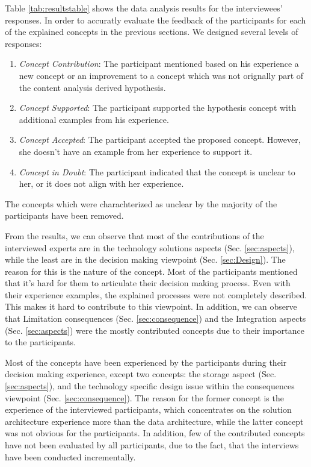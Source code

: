 \documentclass[conference]{IEEEtran}
\begin{document}
Table \ref{tab:resultstable} shows the data analysis results for the
interviewees' responses. In order to accuratly evaluate the feedback of the
participants for each of the explained concepts in the previous sections. We
designed several levels of responses:
\begin{enumerate}
\item \textit{Concept Contribution}: The participant mentioned based on
his experience a new concept or an improvement to a concept which was not
orignally part of the content analysis derived hypothesis.
\item \textit{Concept Supported}: The participant
supported the hypothesis concept with additional examples from his experience.
\item \textit{Concept Accepted}: The participant accepted
the proposed concept. However, she doesn't have an example from her experience
to support it.
\item \textit{Concept in Doubt}: The participant indicated that the concept is
unclear to her, or it does not align with her experience.
\end{enumerate}
The concepts which were charachterized as unclear by the majority of the
participants have been removed.

From the results, we can observe that most of the contributions of the
interviewed experts are in the technology solutions aspects (Sec.
\ref{sec:aspects}), while the least are in the decision making viewpoint (Sec.
\ref{sec:Design}). The reason for this is the nature of the concept. Most of
the participants mentioned that it's hard for them to articulate their decision
making process. Even with their experience examples, the explained processes
were not completely described. This makes it hard to contribute to this
viewpoint. In addition, we can observe that Limitation consequences (Sec.
\ref{sec:consequence}) and the Integration aspects (Sec. \ref{sec:aspects}) were
the mostly contributed concepts due to their importance to the participants.

Most of the concepts have been experienced by the participants during their
decision making experience, except two concepts: the storage aspect (Sec.
\ref{sec:aspects}), and the technology specific design issue within the
consequences viewpoint (Sec. \ref{sec:consequence}). The reason for the former
concept is the experience of the interviewed participants, which concentrates on
the solution architecture experience more than the data architecture, while the
latter concept was not obvious for the participants. In addition, few of the
contributed concepts have not been evaluated by all participants, due to the
fact, that the interviews have been conducted incrementally.
\end{document}
